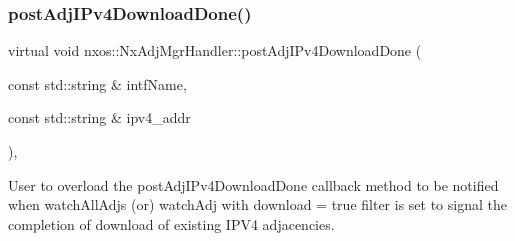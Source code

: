 \subsubsection{\texorpdfstring{post\+Adj\+I\+Pv4\+Download\+Done()}{postAdjIPv4DownloadDone()}}
{\footnotesize\ttfamily virtual void nxos\+::\+Nx\+Adj\+Mgr\+Handler\+::post\+Adj\+I\+Pv4\+Download\+Done (\begin{DoxyParamCaption}\item[{const std\+::string \&}]{intf\+Name,  }\item[{const std\+::string \&}]{ipv4\+\_\+addr }\end{DoxyParamCaption})\hspace{0.3cm}{\ttfamily [inline]}, {\ttfamily [virtual]}}

User to overload the post\+Adj\+I\+Pv4\+Download\+Done callback method to be notified when watch\+All\+Adjs (or) watch\+Adj with download = true filter is set to signal the completion of download of existing I\+P\+V4 adjacencies. 
